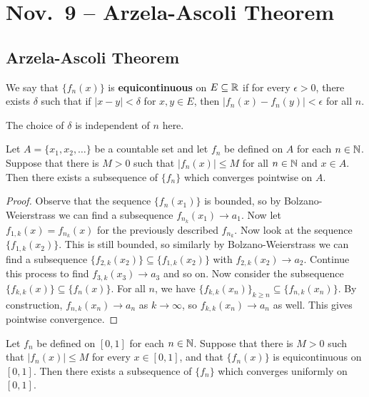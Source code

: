 \chapter{Nov.~9 -- Arzela-Ascoli Theorem}

\section{Arzela-Ascoli Theorem}

\begin{definition}
  We say that $\{f_n(x)\}$ is \textbf{equicontinuous}
  on $E \subseteq \mathbb{R}$ if for every $\epsilon > 0$,
  there exists $\delta$ such that if
  $|x - y| < \delta$ for $x, y \in E$, then
  $|f_n(x) - f_n(y)| < \epsilon$ for all $n$.
\end{definition}

\begin{remark}
  The choice of $\delta$ is independent of $n$ here.
\end{remark}

\begin{lemma}
  \label{lem:pointwise-subsequence}
  Let $A = \{x_1, x_2, \dots\}$ be a countable set and
  let $f_n$ be defined on $A$ for each $n \in \mathbb{N}$.
  Suppose that there is $M > 0$ such that
  $|f_n(x)| \le M$ for all $n \in \mathbb{N}$ and $x \in A$.
  Then there exists a subsequence of $\{f_n\}$ which
  converges pointwise on $A$.
\end{lemma}

\begin{proof}
  Observe that the sequence $\{f_n(x_1)\}$ is bounded,
  so by Bolzano-Weierstrass we can find a subsequence
  $f_{n_k}(x_1) \to a_1$. Now let
  $f_{1, k}(x) = f_{n_k}(x)$ for the previously
  described $f_{n_k}$. Now look at the sequence
  $\{f_{1, k}(x_2)\}$. This is still bounded, so similarly
  by Bolzano-Weierstrass we can find a subsequence
  $\{f_{2, k}(x_2)\} \subseteq \{f_{1, k}(x_2)\}$
  with $f_{2, k}(x_2) \to a_2$. Continue this process
  to find $f_{3, k}(x_3) \to a_3$ and so on.
  Now consider the subsequence
  $\{f_{k, k}(x)\} \subseteq \{f_n(x)\}$. For all
  $n$, we have
  $\{f_{k, k}(x_n)\}_{k \ge n} \subseteq \{f_{n, k}(x_n)\}$.
  By construction, $f_{n, k}(x_n) \to a_n$ as $k \to \infty$,
  so $f_{k, k}(x_n) \to a_n$ as well. This gives
  pointwise convergence.
\end{proof}

\begin{theorem}
  Let $f_n$ be defined on $[0, 1]$ for each $n \in \mathbb{N}$.
  Suppose that there is $M > 0$ such that
  $|f_n(x)| \le M$ for every $x \in [0, 1]$,
  and that $\{f_n(x)\}$ is equicontinuous on $[0, 1]$.
  Then there exists a subsequence of $\{f_n\}$ which
  converges uniformly on $[0, 1]$.
\end{theorem}

